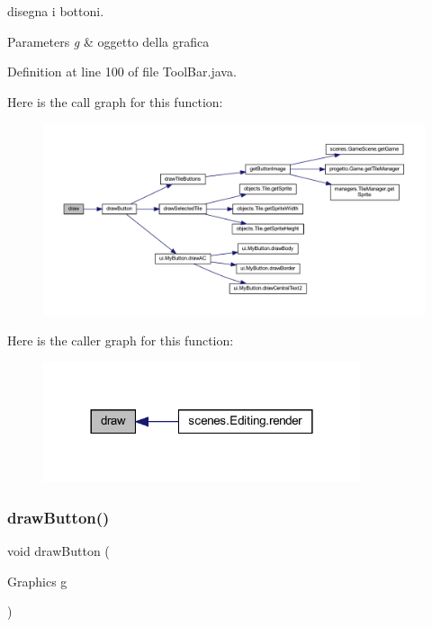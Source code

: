 disegna i bottoni. 


\begin{DoxyParams}{Parameters}
{\em g} & oggetto della grafica \\
\hline
\end{DoxyParams}


Definition at line 100 of file Tool\+Bar.\+java.

Here is the call graph for this function\+:\nopagebreak
\begin{figure}[H]
\begin{center}
\leavevmode
\includegraphics[width=350pt]{classui_1_1_tool_bar_a72fe1ffca978e99fd16994a10e7f8051_cgraph}
\end{center}
\end{figure}
Here is the caller graph for this function\+:\nopagebreak
\begin{figure}[H]
\begin{center}
\leavevmode
\includegraphics[width=264pt]{classui_1_1_tool_bar_a72fe1ffca978e99fd16994a10e7f8051_icgraph}
\end{center}
\end{figure}
\mbox{\label{classui_1_1_tool_bar_a65768678909bc0512c6cb9780709ad38}} 
\subsubsection{\texorpdfstring{draw\+Button()}{drawButton()}}
{\footnotesize\ttfamily void draw\+Button (\begin{DoxyParamCaption}\item[{Graphics}]{g }\end{DoxyParamCaption})}



